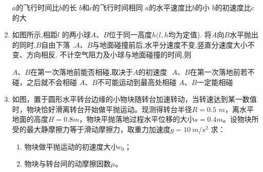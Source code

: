 \begin{enumerate}[leftmargin=0em]
\fourchoices
{$ a $的飞行时间比$ b $的长}
{$ b $和$ c $的飞行时间相同}
{$ a $的水平速度比$ b $的小}
{$ b $的初速度比$ c $的大}


\item 
{}
如图所示,相距$ l $ 的两小球$ A $、$ B $位于同一高度$ h(l,h $均为定值). 将$ A $向$ B $水平抛出的同时,$ B $自由下落 $. A $、$ B $与地面碰撞前后,水平分速度不变,竖直分速度大小不变、方向相反. 不计空气阻力及小球与地面碰撞的时间,则  
\begin{figure}[h!]
\centering

\end{figure}





\fourchoices
{$ A $、$ B $在第一次落地前能否相碰,取决于$ A $的初速度}
{$ $ $ A $、$ B $在第一次落地前若不碰，之后就不会相碰}
{$ A $、$ B $不可能运动到最高处相碰}
{$ A $、$ B $一定能相碰}




\item 
{}
如图，置于圆形水平转台边缘的小物块随转台加速转动，当转速达到某一数值时，物块恰好滑离转台开始做平抛运动。现测得转台半径$ R=0.5 $ $ m $，离水平地面的高度$ H=0.8m $，物块平抛落地过程水平位移的大小$ s=0.4m $。设物块所受的最大静摩擦力等于滑动摩擦力，取重力加速度$ g=10 \ m/s^{2} $ 求：
\begin{enumerate}
\renewcommand{\labelenumi}{\arabic{enumi}.}
\item
物块做平抛运动的初速度大小$ v_{0} $；
\item 
物块与转台间的动摩擦因数$ \mu $。

\end{enumerate}
\begin{figure}[h!]
\flushright

\end{figure}


\end{enumerate}

